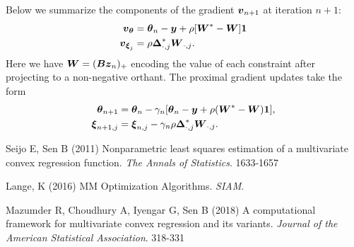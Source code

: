 \documentclass{article}
\begin{document}
Below we summarize the components of the gradient \(\boldsymbol{v}_{n+1}\) at iteration \(n+1\):
\begin{align*}
    \boldsymbol{v}_{\boldsymbol{\theta}}
    &=
    \boldsymbol{\theta}_{n} - \boldsymbol{y} + \rho [\boldsymbol{W}^{\ast} - \boldsymbol{W}] \boldsymbol{1} \\
    \boldsymbol{v}_{\boldsymbol{\xi}_{j}}
    &=
    \rho \boldsymbol{\Delta}_{\cdot,j}^{\ast} \boldsymbol{W}_{\cdot,j}.
\end{align*}
Here we have \(\boldsymbol{W} = (\boldsymbol{B} \boldsymbol{z}_{n})_{+}\) encoding the value of each constraint after projecting to a non-negative orthant.
The proximal gradient updates take the form
\begin{align*}
    \boldsymbol{\theta}_{n+1}
    &=
    \boldsymbol{\theta}_{n}
    - \gamma_{n} [\boldsymbol{\theta}_{n} - \boldsymbol{y} + \rho (\boldsymbol{W}^{\ast} - \boldsymbol{W}) \boldsymbol{1}], \\
    \boldsymbol{\xi}_{n+1,j}
    &=
    \boldsymbol{\xi}_{n,j} - \gamma_{n} \rho \boldsymbol{\Delta}_{\cdot,j}^{\ast} \boldsymbol{W}_{\cdot,j}.
\end{align*}


\begin{thebibliography}{99}
    Seijo E, Sen B (2011) {Nonparametric least squares estimation of a multivariate convex regression function}. {\it The Annals of Statistics}. 1633-1657
    
    Lange, K (2016) {MM Optimization Algorithms}. {\it SIAM}.

    Mazumder R, Choudhury A, Iyengar G, Sen B (2018) {A computational framework for multivariate convex regression and its variants}. {\it Journal of the American Statistical Association}. 318-331
\end{thebibliography}
\end{document}
